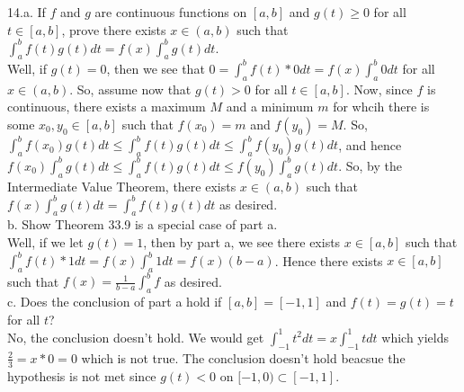\documentclass[12pt]{article}
\begin{document}
14.a. If $f$ and $g$ are continuous functions on $[a,b]$ and $g(t)\geq0$ for all $t\in[a,b]$, prove there exists $x\in(a,b)$ such that $\int_a^bf(t)g(t)dt=f(x)\int_a^bg(t)dt$.\\
Well, if $g(t)=0$, then we see that $0=\int_a^bf(t)*0dt=f(x)\int_a^b0dt$ for all $x\in(a,b)$. So, assume now that $g(t)>0$ for all $t\in[a,b]$. Now, since $f$ is continuous, there exists a maximum $M$ and a minimum $m$ for whcih there is some $x_0,y_0\in[a,b]$ such that $f(x_0)=m$ and $f(y_0)=M$. So, $\int_a^bf(x_0)g(t)dt\leq\int_a^bf(t)g(t)dt\leq\int_a^bf(y_0)g(t)dt$, and hence $f(x_0)\int_a^bg(t)dt\leq\int_a^bf(t)g(t)dt\leq f(y_0)\int_a^bg(t)dt$. So, by the Intermediate Value Theorem, there exists $x\in(a,b)$ such that $f(x)\int_a^bg(t)dt=\int_a^bf(t)g(t)dt$ as desired.\\
b. Show Theorem 33.9 is a special case of part a.\\
Well, if we let $g(t)=1$, then by part a, we see there exists $x\in[a,b]$ such that $\int_a^bf(t)*1dt=f(x)\int_a^b1dt=f(x)(b-a)$. Hence there exists $x\in[a,b]$ such that $f(x)=\frac{1}{b-a}\int_a^bf$ as desired.\\
c. Does the conclusion of part a hold if $[a,b]=[-1,1]$ and $f(t)=g(t)=t$ for all $t$?\\
No, the conclusion doesn't hold. We would get $\int_{-1}^1t^2dt=x\int_{-1}^1tdt$ which yields $\frac23=x*0=0$ which is not true. The conclusion doesn't hold beacsue the hypothesis is not met since $g(t)<0$ on $[-1,0)\subset[-1,1]$.
\end{document}
